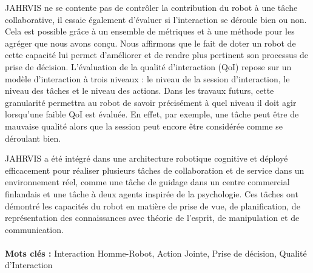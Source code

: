 \documentclass[english,a4paper,11pt,twoside]{StyleThese}
\begin{document}
JAHRVIS ne se contente pas de contrôler la contribution du robot à une tâche collaborative, il essaie également d'évaluer si l'interaction se déroule bien ou non. Cela est possible grâce à un ensemble de métriques et à une méthode pour les agréger que nous avons conçu. Nous affirmons que le fait de doter un robot de cette capacité lui permet d'améliorer et de rendre plus pertinent son processus de prise de décision. L'évaluation de la qualité d’interaction (QoI) repose sur un modèle d'interaction à trois niveaux : le niveau de la session d'interaction, le niveau des tâches et le niveau des actions. Dans les travaux futurs, cette granularité permettra au robot de savoir précisément à quel niveau il doit agir lorsqu'une faible QoI est évaluée. En effet, par exemple, une tâche peut être de mauvaise qualité alors que la session peut encore être considérée comme se déroulant bien.


JAHRVIS a été intégré dans une architecture robotique cognitive et déployé efficacement pour réaliser plusieurs tâches de collaboration et de service dans un environnement réel, comme une tâche de guidage dans un centre commercial finlandais et une tâche à deux agents inspirée de la psychologie. Ces tâches ont démontré les capacités du robot en matière de prise de vue, de planification, de représentation des connaissances avec théorie de l'esprit, de manipulation et de communication.
\\
\\
\textbf{Mots clés :} Interaction Homme-Robot, Action Jointe, Prise de décision, Qualité d'Interaction

%
%

\iftoggle{ThesisInEnglish}{%
\chapter*{Acknowledgments}
}{%
\chapter*{Remerciements}
}
\end{document}
